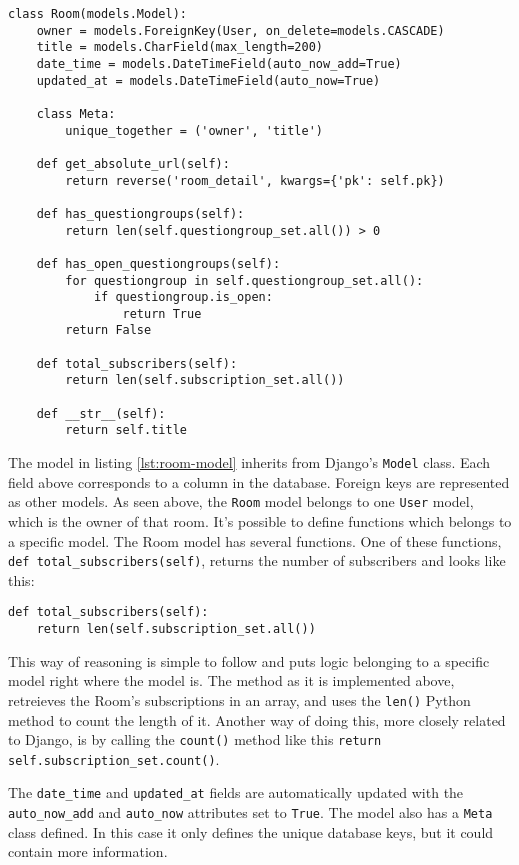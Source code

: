 \begin{lstlisting}[caption=The Room Model, label=lst:room-model]
class Room(models.Model):
    owner = models.ForeignKey(User, on_delete=models.CASCADE)
    title = models.CharField(max_length=200)
    date_time = models.DateTimeField(auto_now_add=True)
    updated_at = models.DateTimeField(auto_now=True)

    class Meta:
        unique_together = ('owner', 'title')

    def get_absolute_url(self):
        return reverse('room_detail', kwargs={'pk': self.pk})

    def has_questiongroups(self):
        return len(self.questiongroup_set.all()) > 0

    def has_open_questiongroups(self):
        for questiongroup in self.questiongroup_set.all():
            if questiongroup.is_open:
                return True
        return False

    def total_subscribers(self):
        return len(self.subscription_set.all())

    def __str__(self):
        return self.title
\end{lstlisting}


The model in listing \ref{lst:room-model} inherits from Django's \texttt{Model} class. Each field above corresponds to a column in the database. Foreign keys are represented as other models. As seen above, the \texttt{Room} model belongs to one \texttt{User} model, which is the owner of that room. 
It's possible to define functions which belongs to a specific model. The Room model has several functions. One of these functions, \texttt{def total\_subscribers(self)}, returns the number of subscribers and looks like this:

\begin{lstlisting}[caption=The total subscribers method, label=lst:total-subscribers-method]
def total_subscribers(self):
    return len(self.subscription_set.all())
\end{lstlisting}
This way of reasoning is simple to follow and puts logic belonging to a specific model right where the model is. The method as it is implemented above, retreieves the Room's subscriptions in an array, and uses the \texttt{len()} Python method to count the length of it. Another way of doing this, more closely related to Django, is by calling the \texttt{count()} method like this \texttt{return self.subscription\_set.count()}.

The \texttt{date\_time} and \texttt{updated\_at} fields are automatically updated with the \texttt{auto\_now\_add} and \texttt{auto\_now} attributes set to \texttt{True}. The model also has a \texttt{Meta} class defined. In this case it only defines the unique database keys, but it could contain more information.

